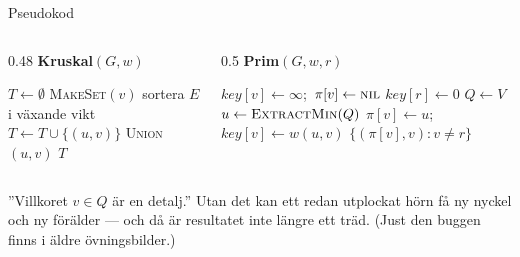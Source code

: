 \documentclass[11pt,aspectratio=169,xcolor=table,t]{beamer}
\begin{document}
\begin{frame}{Pseudokod}
\begin{columns}[T]
\begin{column}{0.48\textwidth}
{\small\bfseries\color{kthnavy}Kruskal$(G,w)$}
\footnotesize
\begin{algorithmic}[1]
\State $T\gets\emptyset$
 \State \textsc{MakeSet}$(v)$ \EndFor
\State sortera $E$ i växande vikt
    \State $T\gets T\cup\{(u,v)\}$
    \State \textsc{Union}$(u,v)$
  \EndIf
\EndFor
\State \Return $T$
\end{algorithmic}
\end{column}
\begin{column}{0.5\textwidth}
{\small\bfseries\color{kthnavy}Prim$(G,w,r)$}
\footnotesize
\begin{algorithmic}[1]
 \State $\mathit{key}[v]\gets\infty$;\ $\pi[v]\gets\textsc{nil}$ \EndFor
\State $\mathit{key}[r]\gets0$
\State $Q\gets V$ 
  \State $u\gets\textsc{ExtractMin}(Q)$
      \State $\pi[v]\gets u$;\ $\mathit{key}[v]\gets w(u,v)$ 
    \EndIf
  \EndFor
\EndWhile
\State \Return $\{(\pi[v],v) : v\neq r\}$
\end{algorithmic}
\end{column}
\end{columns}
\vfill
\begin{missbox}
”Villkoret $v\in Q$ är en detalj.” Utan det kan ett redan utplockat hörn få ny nyckel
och ny förälder — och då är resultatet inte längre ett träd. (Just den buggen finns i
äldre övningsbilder.)
\end{missbox}
\end{frame}
\end{document}
